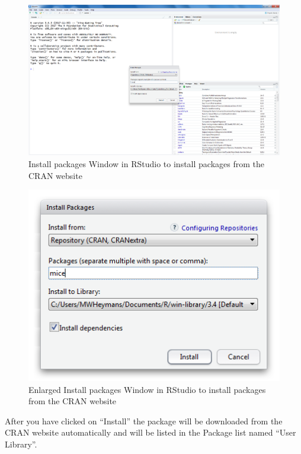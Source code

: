\documentclass[]{book}
\begin{document}
\begin{figure}

{\centering \includegraphics[width=0.95\linewidth]{images/fig1.25a} 

}

\caption{Install packages Window in RStudio to install packages from the CRAN website}\label{fig:fig25}
\end{figure}

\begin{figure}

{\centering \includegraphics[width=0.95\linewidth]{images/fig1.25b} 

}

\caption{Enlarged Install packages Window in RStudio to install packages from the CRAN website}\label{fig:fig26}
\end{figure}

After you have clicked on ``Install'' the package will be downloaded
from the CRAN website automatically and will be listed in the Package
list named ``User Library''.
\end{document}
